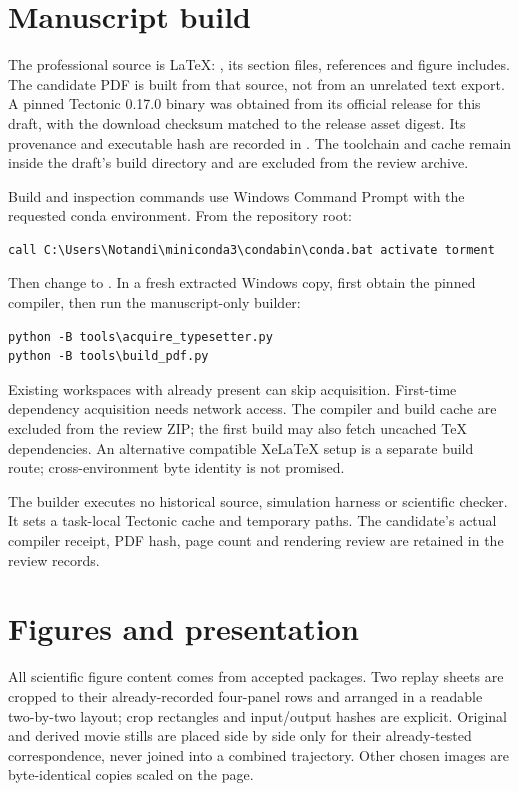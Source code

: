 \section{Manuscript build}
The professional source is LaTeX:
, its section files, references and
figure includes. The candidate PDF is built from that source, not
from an unrelated text export. A pinned Tectonic 0.17.0 binary
was obtained from its official release for this draft, with the
download checksum matched to the release asset digest.
Its provenance and executable hash are recorded in
. The toolchain and cache
remain inside the draft's build directory and are excluded from
the review archive.

Build and inspection commands use Windows Command Prompt with
the requested conda environment. From the repository root:
\begin{verbatim}
call C:\Users\Notandi\miniconda3\condabin\conda.bat activate torment
\end{verbatim}
Then change to
.
In a fresh extracted Windows copy, first obtain the pinned compiler,
then run the manuscript-only builder:
\begin{verbatim}
python -B tools\acquire_typesetter.py
python -B tools\build_pdf.py
\end{verbatim}
Existing workspaces with  already
present can skip acquisition. First-time dependency acquisition needs
network access. The compiler and build cache are excluded from the
review ZIP; the first build may also fetch uncached TeX dependencies.
An alternative compatible XeLaTeX setup is a separate build route;
cross-environment byte identity is not promised.

The builder executes no historical source, simulation harness or
scientific checker. It sets a task-local Tectonic cache and
temporary paths. The candidate's actual compiler receipt,
PDF hash, page count and rendering review are retained in the
review records.

\section{Figures and presentation}
All scientific figure content comes from accepted packages.
Two replay sheets are cropped to their already-recorded four-panel
rows and arranged in a readable two-by-two layout; crop rectangles
and input/output hashes are explicit. Original and derived movie
stills are placed side by side only for their already-tested
correspondence, never joined into a combined trajectory.
Other chosen images are byte-identical copies scaled on the page.

